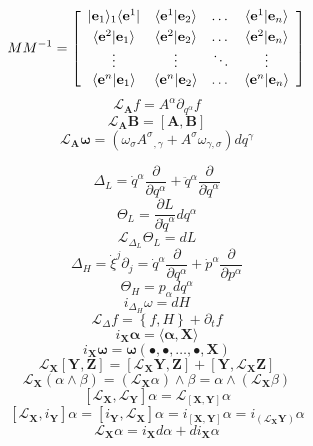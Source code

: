 \documentclass[10pt]{article}
\begin{document}
\[
  M M^{-1} = \left[ \begin{array}{cccc}
                 | {\mathbf e}_1 \rangle_1 \langle {\mathbf e}^1 | & \langle {\mathbf e}^1 | {\mathbf e}_2 \rangle & \dots & \langle {\mathbf e}^1 | {\mathbf e}_n \rangle \vspace{1mm}\\
                 \langle {\mathbf e}^2 | {\mathbf e}_1 \rangle & \langle {\mathbf e}^2 | {\mathbf e}_2 \rangle & \dots & \langle {\mathbf e}^2 | {\mathbf e}_n \rangle \\
	    	     \vdots                   &     \vdots                 & \ddots &   \vdots \\
                 \langle {\mathbf e}^n | {\mathbf e}_1 \rangle & \langle {\mathbf e}^n | {\mathbf e}_2 \rangle & \dots & \langle {\mathbf e}^n | {\mathbf e}_n \rangle \\
			   \end{array}
			   \right]
\]
\[
  {\mathcal L}_{\mathbf A} f = A^{\alpha} \partial_{q^{\alpha}} f
\]
\[
  {\mathcal L}_{\mathbf A} {\mathbf B} = [{\mathbf A},{\mathbf B}]
\]
\[
  {\mathcal L}_{\mathbf A} {\mathbf \omega} = ( \omega_{\sigma} {A^{\sigma}}_{,\gamma} + A^{\sigma} \omega_{\gamma,\sigma} ) d q^{\gamma}
\]

\newpage


\[
  \Delta_L = {\dot q}^{\alpha} \frac{\partial}{\partial q^{\alpha}} + {\ddot q}^{\alpha} \frac{\partial}{\partial {\dot q}^{\alpha}}
\]
\[
  \Theta_L = \frac{\partial L}{\partial {\dot q}^{\alpha}} d q^{\alpha}
\]
\[
  {\mathcal L}_{\Delta_L} \Theta_L = d L
\]
\[
  \Delta_H = {\dot \xi}^{j} \partial_j = {\dot q}^{\alpha} \frac{\partial}{\partial {q^{\alpha}}} + {\dot p}^{\alpha} \frac{\partial}{\partial {p^{\alpha}}}
\]
\[
  \Theta_H = p_{\alpha} d q^{\alpha}
\]
\[
  i_{\Delta_H} \omega = d H
\]
\[
 {\mathcal L}_{\Delta} f = \left\{ f , H \right\} + \partial_t f
\]
\[
  i_{\mathbf X} {\mathbf \alpha} = \langle {\mathbf \alpha} , {\mathbf X} \rangle
\]
\[
  i_{\mathbf X} {\mathbf \omega} = {\mathbf \omega} \left( \bullet , \bullet, \dots, \bullet, {\mathbf X} \right)
\]
\[
   {\mathcal L}_{\mathbf X} \left[ {\mathbf Y}, {\mathbf Z} \right] 
 = \left[ {\mathcal L}_{\mathbf X} {\mathbf Y}, {\mathbf Z} \right] + \left[ {\mathbf Y}, {\mathcal L}_{\mathbf X} {\mathbf Z} \right]
\]
\[
  {\mathcal L}_{\mathbf X} \left( \alpha \wedge \beta \right) 
 = \left( {\mathcal L}_{\mathbf X} \alpha \right) \wedge \beta
 = \alpha \wedge \left( {\mathcal L}_{\mathbf X} \beta \right) 
\]
\[
  \left[ {\mathcal L}_{\mathbf X}, {\mathcal L}_{\mathbf Y} \right] \alpha = {\mathcal L}_{\left[ {\mathbf X}, {\mathbf Y} \right] } \alpha
\]
\[
    \left[ {\mathcal L}_{\mathbf X} , i_{\mathbf Y} \right] \alpha 
  = \left[ i_{\mathbf Y}, {\mathcal L}_{\mathbf X} \right] \alpha 
  = i_{\left[ {\mathbf X}, {\mathbf Y} \right] } \alpha
  = i_{ \left( {\mathcal L}_{\mathbf X} {\mathbf Y} \right) } \alpha
\]
\[
 {\mathcal L}_{\mathbf X} \alpha = i_{\mathbf X} d \alpha + d i_{\mathbf X} \alpha
\]
\end{document}
